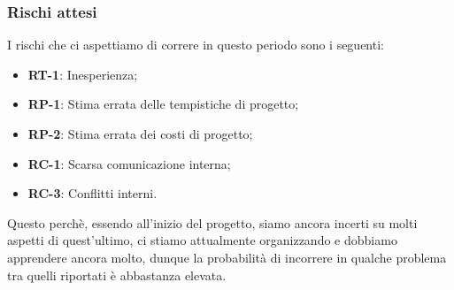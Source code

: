 \subsubsection{Rischi attesi}
I rischi che ci aspettiamo di correre in questo periodo sono i seguenti: 
\begin{itemize}
\setlength{\itemsep}{0em}
\item \textbf{RT-1}: Inesperienza;
\item \textbf{RP-1}: Stima errata delle tempistiche di progetto;
\item \textbf{RP-2}: Stima errata dei costi di progetto;
\item \textbf{RC-1}: Scarsa comunicazione interna;
\item \textbf{RC-3}: Conflitti interni.
\end{itemize}
Questo perchè, essendo all’inizio del progetto, siamo ancora incerti su molti aspetti di
quest’ultimo, ci stiamo attualmente organizzando e dobbiamo apprendere ancora molto, dunque la
probabilità di incorrere in qualche problema tra quelli riportati è abbastanza elevata.
\newpage
